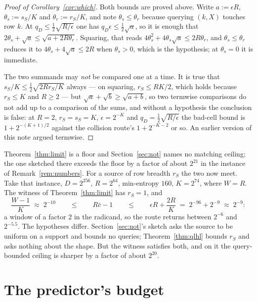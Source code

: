 \documentclass{aicr-solution}
\begin{document}
\begin{proof}[Proof of Corollary~\ref{cor:which}]
Both bounds are proved above. Write $a := \epsilon R$, $\theta_s := s_S/K$ and
$\theta_r := r_S/K$, and note $\theta_s \le \theta_r$ because querying $(k,X)$ touches row $k$. At
$q_D \le \tfrac12\sqrt{R/\epsilon}$ one has $q_D\epsilon \le \tfrac12\sqrt a$, so it is enough that
$2\theta_s + \sqrt a \le \sqrt{a + 2R\theta_r}$. Squaring, that reads
$4\theta_s^{2} + 4\theta_s\sqrt a \le 2R\theta_r$, and $\theta_s \le \theta_r$ reduces it to
$4\theta_s + 4\sqrt a \le 2R$ when $\theta_s > 0$, which is the hypothesis; at $\theta_s = 0$ it is
immediate.

The two summands may \emph{not} be compared one at a time. It is true that
$s_S/K \le \tfrac12\sqrt{2Rr_S/K}$ always --- on squaring, $r_S \le RK/2$, which holds because
$r_S \le K$ and $R \ge 2$ --- but $\sqrt a + \sqrt b \ge \sqrt{a+b}$, so two termwise comparisons
do not add up to a comparison of the sums, and without a hypothesis the conclusion is false: at
$R = 2$, $r_S = s_S = K$, $\epsilon = 2^{-K}$ and $q_D = \tfrac12\sqrt{R/\epsilon}$ the bad-cell
bound is $1 + 2^{-(K+1)/2}$ against the collision route's $1 + 2^{-K-2}$ or so. An earlier version
of this note argued termwise.
\end{proof}

\begin{remark}%
\label{rem:window}
Theorem~\ref{thm:limit} is a floor and Section~\ref{sec:not} names no matching ceiling; the one
sketched there exceeds the floor by a factor of about $2^{21}$ in the instance of
Remark~\ref{rem:numbers}. For a source of row breadth $r_S$ the two now meet. Take that instance,
$D = 2^{256}$, $R = 2^{64}$, min-entropy $160$, $K = 2^{74}$, where $W = R$. The witness of
Theorem~\ref{thm:limit} has $r_S = 1$, and
\[
  \frac{W-1}{K} \;\approx\; 2^{-10}
  \qquad\le\qquad R\bar c - 1 \qquad\le\qquad
  \epsilon R + \frac{2R}{K} \;=\; 2^{-96} + 2^{-9} \;\approx\; 2^{-9} :
\]
a window of a factor $2$ in the radicand, so the route returns between $2^{-6}$ and $2^{-5.5}$. The
hypotheses differ. Section~\ref{sec:not}'s sketch asks the source to be uniform on a support and
bounds no queries; Theorem~\ref{thm:qlhl} bounds $r_S$ and asks nothing about the shape. But the
witness satisfies both, and on it the query-bounded ceiling is sharper by a factor of about
$2^{20}$.
\end{remark}

\section{The predictor's budget}\label{sec:predictor}
\end{document}
